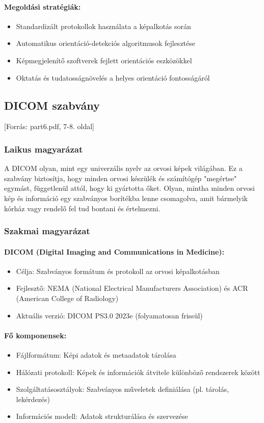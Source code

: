 \documentclass[a4paper,12pt]{article}
\begin{document}
\paragraph{Megoldási stratégiák:} \begin{itemize} \item Standardizált protokollok használata a képalkotás során \item Automatikus orientáció-detekciós algoritmusok fejlesztése \item Képmegjelenítő szoftverek fejlett orientációs eszközökkel \item Oktatás és tudatosságnövelés a helyes orientáció fontosságáról \end{itemize}

\subsection{DICOM szabvány} [Forrás: part6.pdf, 7-8. oldal]

\subsubsection{Laikus magyarázat} A DICOM olyan, mint egy univerzális nyelv az orvosi képek világában. Ez a szabvány biztosítja, hogy minden orvosi készülék és számítógép "megértse" egymást, függetlenül attól, hogy ki gyártotta őket. Olyan, mintha minden orvosi kép és információ egy szabványos borítékba lenne csomagolva, amit bármelyik kórház vagy rendelő fel tud bontani és értelmezni.

\subsubsection{Szakmai magyarázat}

\paragraph{DICOM (Digital Imaging and Communications in Medicine):} \begin{itemize} \item Célja: Szabványos formátum és protokoll az orvosi képalkotásban \item Fejlesztő: NEMA (National Electrical Manufacturers Association) és ACR (American College of Radiology) \item Aktuális verzió: DICOM PS3.0 2023e (folyamatosan frissül) \end{itemize}

\paragraph{Fő komponensek:} \begin{itemize} \item Fájlformátum: Képi adatok és metaadatok tárolása \item Hálózati protokoll: Képek és információk átvitele különböző rendszerek között \item Szolgáltatásosztályok: Szabványos műveletek definiálása (pl. tárolás, lekérdezés) \item Információs modell: Adatok strukturálása és szervezése \end{itemize}
\end{document}
